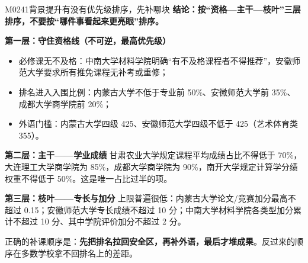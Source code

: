 \begin{qa}{M0241}{背景提升有没有优先级排序，先补哪块}
\textbf{结论：按“资格—主干—枝叶”三层排序，不要按“哪件事看起来更亮眼”排序。}

\textbf{第一层：守住资格线（不可逆，最高优先级）}
\begin{itemize}
  \item 必修课无不及格：中南大学材料学院明确“有不及格课程者不得推荐”，安徽师范大学要求所有推免课程无补考或重修；
  \item 排名进入入围比例：内蒙古大学不低于专业前 50\%、安徽师范大学前 35\%、成都大学商学院前 20\%；
  \item 外语门槛：内蒙古大学四级 425、安徽师范大学四级不低于 425（艺术体育类 355）。
\end{itemize}

\textbf{第二层：主干——学业成绩}
甘肃农业大学规定课程平均成绩占比不得低于 70\%，大连理工大学商学院为 85\%，成都大学商学院为 90\%，南开大学规定计算学分绩权重不得低于 50\%。这是唯一占比过半的项。

\textbf{第三层：枝叶——专长与加分}
上限普遍很低：内蒙古大学论文/竞赛加分最高不超过 0.15；安徽师范大学专长成绩不超过 10 分；中南大学材料学院各类型加分累计不超过 10 分、其中学院评价加分不超过 2 分。

正确的补课顺序是：\textbf{先把排名拉回安全区，再补外语，最后才堆成果}。反过来的顺序在多数学校拿不回排名上的差距。
\end{qa}

